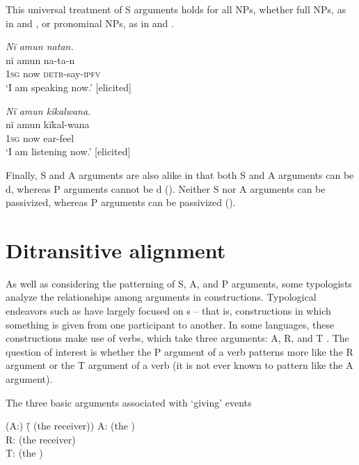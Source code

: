 This universal treatment of S arguments holds for all NPs, whether full NPs, as in  and , or pronominal NPs, as in  and .

\ea%
    \label{ex:clause:29}
          \textit{Nï amun natan.}\\
\gll    nï    amun  na-ta-n\\
    1\textsc{sg}  now  \textsc{detr-}say-\textsc{ipfv}\\
\glt `I am speaking now.’ [elicited]
\z

\ea%
    \label{ex:clause:30}
          \textit{Nï amun kïkalwana.}\\
\gll    nï    amun  kïkal-wana\\
    1\textsc{sg}  now  ear-feel\\
\glt `I am listening now.’ [elicited]
\z

Finally, S and A arguments are also alike in that both S and A arguments can be d, whereas P arguments cannot be d (). Neither S nor A arguments can be passivized, whereas P arguments can be passivized ().


\section{Ditransitive alignment}\label{sec:11.3}


As well as considering the  patterning of S, A, and P arguments, some typologists analyze the relationships among arguments in  constructions. Typological endeavors such as \citet{MalchukovEtAl2010} have largely focused on s -- that is, constructions in which something is given from one participant to another. In some languages, these constructions make use of  verbs, which take three arguments: A, R, and T . The question of interest is whether the P argument of a  verb patterns more like the R argument or the T argument of a  verb (it is not ever known to pattern like the A argument).

\ea%
    \label{ex:clause:30a}
The three basic arguments associated with ‘giving’ events
\begin{tabbing}
{(A:)} \= {( (the receiver))}\kill
{A:} \> { (the )}\\
{R:} \> { (the receiver)}\\
{T:} \> { (the )}
\end{tabbing}
\z

